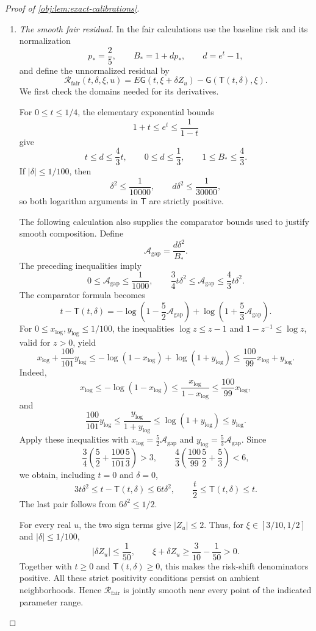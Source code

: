 \documentclass[11pt]{article}
\begin{document}
\begin{proof}[Proof of \cref{obj:lem:exact-calibrations}]
\begin{enumerate}
\item \emph{The smooth fair residual.}
In the fair calculations use the baseline risk and its normalization
\[
p_*=\frac25,\qquad B_*=1+dp_*,
\qquad d=e^t-1,
\]
and define the unnormalized residual by
\[
\mathcal R_{\mathrm{fair}}(t,\delta,\xi,u)
=
E\mathsf G(t,\xi+\delta Z_u)
-\mathsf G(\mathsf T(t,\delta),\xi).
\]
We first check the domains needed for its derivatives.

For \(0\le t\le1/4\), the elementary exponential bounds
\[
1+t\le e^t\le\frac1{1-t}
\]
give
\[
t\le d\le\frac43t,\qquad
0\le d\le\frac13,\qquad
1\le B_*\le\frac43.
\]
If \(|\delta|\le1/100\), then
\[
\delta^2\le\frac1{10000},
\qquad
d\delta^2\le\frac1{30000},
\]
so both logarithm arguments in \(\mathsf T\) are strictly positive.

The following calculation also supplies the comparator bounds used to justify smooth composition. Define
\[
\mathcal A_{\mathrm{gap}}=\frac{d\delta^2}{B_*}.
\]
The preceding inequalities imply
\[
0\le\mathcal A_{\mathrm{gap}}\le\frac1{1000},
\qquad
\frac34t\delta^2\le\mathcal A_{\mathrm{gap}}
\le\frac43t\delta^2.
\]
The comparator formula becomes
\[
t-\mathsf T(t,\delta)
=
-\log\!\left(1-\frac52\mathcal A_{\mathrm{gap}}\right)
+\log\!\left(1+\frac53\mathcal A_{\mathrm{gap}}\right).
\]
For \(0\le x_{\log},y_{\log}\le1/100\), the inequalities
\(\log z\le z-1\) and \(1-z^{-1}\le\log z\), valid for \(z>0\), yield
\[
x_{\log}+\frac{100}{101}y_{\log}
\le-\log(1-x_{\log})+\log(1+y_{\log})
\le\frac{100}{99}x_{\log}+y_{\log}.
\]
Indeed,
\[
x_{\log}\le-\log(1-x_{\log})
\le\frac{x_{\log}}{1-x_{\log}}
\le\frac{100}{99}x_{\log},
\]
and
\[
\frac{100}{101}y_{\log}
\le\frac{y_{\log}}{1+y_{\log}}
\le\log(1+y_{\log})\le y_{\log}.
\]
Apply these inequalities with
\(x_{\log}=\frac52\mathcal A_{\mathrm{gap}}\) and
\(y_{\log}=\frac53\mathcal A_{\mathrm{gap}}\). Since
\[
\frac34\left(\frac52+\frac{100}{101}\frac53\right)>3,
\qquad
\frac43\left(\frac{100}{99}\frac52+\frac53\right)<6,
\]
we obtain, including \(t=0\) and \(\delta=0\),
\[
3t\delta^2\le t-\mathsf T(t,\delta)\le6t\delta^2,
\qquad
\frac t2\le\mathsf T(t,\delta)\le t.
\]
The last pair follows from \(6\delta^2\le1/2\).

For every real \(u\), the two sign terms give \(|Z_u|\le2\). Thus, for
\(\xi\in[3/10,1/2]\) and \(|\delta|\le1/100\),
\[
|\delta Z_u|\le\frac1{50},
\qquad
\xi+\delta Z_u\ge\frac3{10}-\frac1{50}>0.
\]
Together with \(t\ge0\) and \(\mathsf T(t,\delta)\ge0\), this makes the risk-shift denominators positive. All these strict positivity conditions persist on ambient neighborhoods. Hence \(\mathcal R_{\mathrm{fair}}\) is jointly smooth near every point of the indicated parameter range.


\end{enumerate}
\end{proof}
\end{document}
